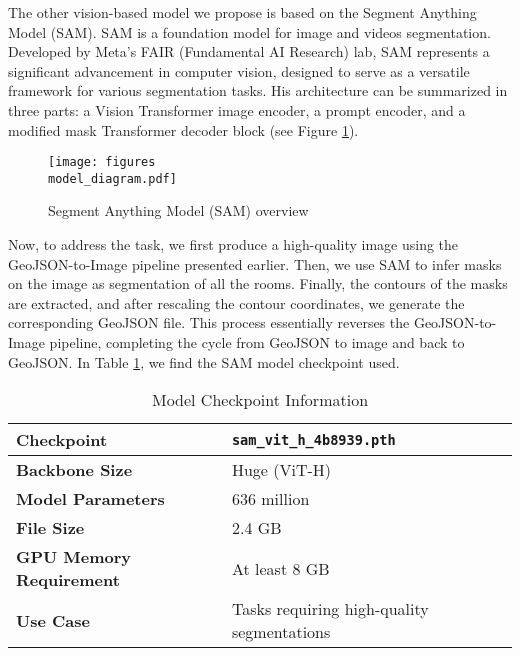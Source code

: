 \documentclass{article}
\begin{document}
The other vision-based model we propose is based on the Segment Anything Model (SAM). SAM is a foundation model for image and videos segmentation. Developed by Meta's FAIR (Fundamental AI Research) lab, SAM represents a significant advancement in computer vision, designed to serve as a versatile framework for various segmentation tasks. His architecture can be summarized in three parts: a Vision Transformer image encoder, a prompt encoder, and a modified mask Transformer decoder block (see Figure \ref{label}).

\begin{figure}[h!]
    \centering
    \texttt{[image: figures\\model\_diagram.pdf]}
    \caption{Segment Anything Model (SAM) overview}
    \label{label}
\end{figure}

Now, to address the task, we first produce a high-quality image using the GeoJSON-to-Image pipeline presented earlier. Then, we use SAM to infer masks on the image as segmentation of all the rooms. Finally, the contours of the masks are extracted, and after rescaling the contour coordinates, we generate the corresponding GeoJSON file. This process essentially reverses the GeoJSON-to-Image pipeline, completing the cycle from GeoJSON to image and back to GeoJSON. In Table \ref{tab:model_checkpoint}, we find the SAM model checkpoint used.

\begin{table}[h]
    \centering
    \begin{tabular}{|l|l|}
        \hline
        \textbf{Checkpoint} & \texttt{sam\_vit\_h\_4b8939.pth} \\ \hline
        \textbf{Backbone Size} & Huge (ViT-H) \\ \hline
        \textbf{Model Parameters} & 636 million \\ \hline
        \textbf{File Size} & 2.4 GB \\ \hline
        \textbf{GPU Memory Requirement} & At least 8 GB \\ \hline
        \textbf{Use Case} & Tasks requiring high-quality segmentations \\ \hline
    \end{tabular}
    \caption{Model Checkpoint Information}
    \label{tab:model_checkpoint}
\end{table}
\end{document}
